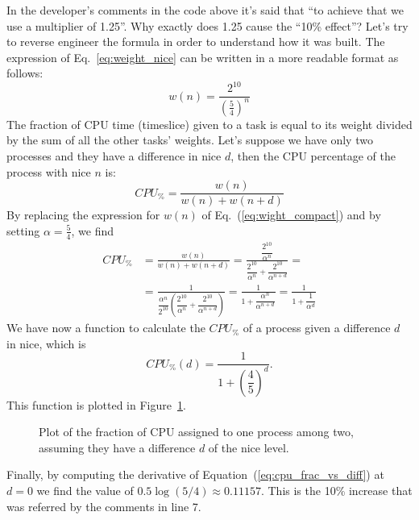 In the developer's comments in the code above it's said that ``to achieve that we use a multiplier of 1.25''. Why exactly does 1.25 cause the ``10\% effect''? Let's try to reverse engineer the formula in order to understand how it was built. The expression of Eq.~\eqref{eq:weight_nice} can be written in a more readable format as follows:
\begin{equation}
    w(n) = \frac{2^{10}}{\left(\frac{5}{4}\right)^{n}}
    \label{eq:wight_compact}
\end{equation}
The fraction of CPU time (timeslice) given to a task is equal to its weight divided by the sum of all the other tasks' weights. Let's suppose we have only two processes and they have a difference in nice $d$, then the CPU percentage of the process with nice $n$ is:
\begin{equation}
    CPU_\% = \frac{w(n)}{w(n)+w(n+d)}
\end{equation}
By replacing the expression for $w(n)$ of Eq.~(\ref{eq:wight_compact}) and by setting $\alpha=\frac{5}{4}$, we find
\begin{align*}
    CPU_\% &=\frac{w(n)}{w(n)+w(n+d)}=
    \frac{\dfrac{2^{10}}{\alpha^{n}}}{\dfrac{2^{10}}{\alpha^{n}}+\dfrac{2^{10}}{\alpha^{n+d}}} =\\
    &=\frac{1}{\dfrac{\alpha^{n}}{2^{10}} \left(\dfrac{2^{10}}{\alpha^{n}}+\dfrac{2^{10}}{\alpha^{n+d}}\right)} =
    \frac{1}{1+\dfrac{\alpha^{n}}{\alpha^{n+d}}} =
    \frac{1}{1+\dfrac{1}{\alpha^{d}}}
\end{align*}
We have now a function to calculate the $CPU_\%$ of a process given a difference $d$ in nice, which is
\begin{equation}
    CPU_\%(d)=\frac{1}{1+\left(\dfrac{4}{5}\right)^{d}}.
    \label{eq:cpu_frac_vs_diff}
\end{equation}
This function is plotted in Figure~\ref{fig:plot_cpu}.
\begin{figure}[htb]
\centering
{}
\label{fig:plot_cpu}
\caption{Plot of the fraction of CPU assigned to one process among two, assuming they have a difference $d$ of the nice level.}
\end{figure}
Finally, by computing the derivative of Equation~(\ref{eq:cpu_frac_vs_diff}) at $d=0$ we find the value of $0.5\log(5/4)\approx 0.11157$. This is the 10\% increase that was referred by the comments in line 7. 

